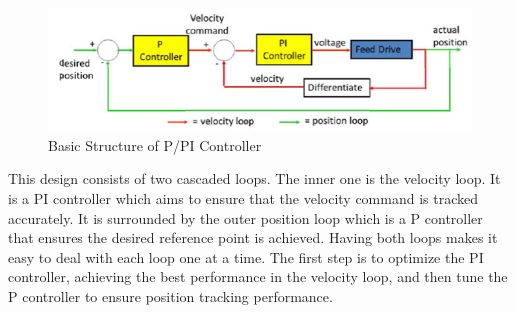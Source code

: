 \documentclass[letterpaper]{article}
\begin{document}
\begin{figure}[H]
\begin{center}
\includegraphics[width = 14 cm]{q3_7}
\caption{Basic Structure of P/PI Controller}
\label{q3_7}
\end{center}
\end{figure}

This design consists of two cascaded loops. The inner one is the velocity loop. It is a PI controller which aims to ensure that the velocity command is tracked accurately. It is surrounded by the outer position loop which is a P controller that ensures the desired reference point is achieved. Having both loops makes it easy to deal with each loop one at a time. The first step is to optimize the PI controller, achieving the best performance in the velocity loop, and then tune the P controller to ensure position tracking performance.\\
\end{document}
